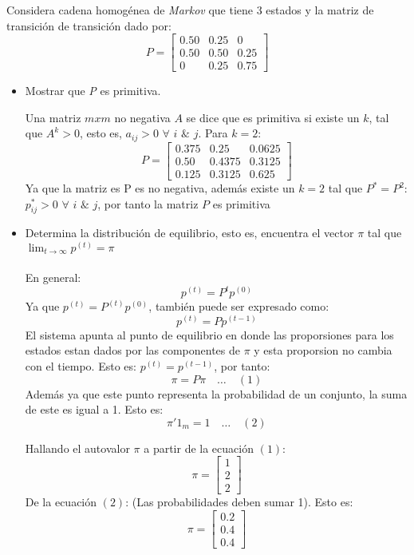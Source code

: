 Considera cadena homogénea de \textit{Markov} que tiene 3 estados y la matriz
    de transición de transición dado por:
    \[
        P =
            \begin{bmatrix}
                0.50 & 0.25 & 0 \\
                0.50 & 0.50 & 0.25\\
                0 & 0.25 & 0.75
            \end{bmatrix}
    \]
    \begin{itemize}
        \item Mostrar que \textit{P} es primitiva.

        Una matriz $mxm$ no negativa $A$ se dice que es primitiva si existe un $k$, tal que
        $A^k > 0$, esto es, $a_{ij} > 0$ $\forall$ $i$ $\&$ $j$. 
        Para $k = 2$:\\
        \[
            P =
                \begin{bmatrix}
                    0.375 & 0.25 & 0.0625 \\
                    0.50 & 0.4375 & 0.3125\\
                    0.125 & 0.3125 & 0.625
                \end{bmatrix}
        \]
        Ya que la matriz es P es no negativa, además existe un $k = 2$ tal que $P^* = P^2$: $p^*_{ij} > 0$ $\forall$ $i$ $\&$ $j$, por tanto la matriz $P$ es primitiva
        \item Determina la distribución de equilibrio, esto es, encuentra el vector
        $\pi$ tal que $\lim_{t \to \infty} p^{(t)} = \pi$\\\\
        En general:
        \[
            p^{(t)} = P^tp^{(0)} 
        \]
        Ya que $p^{(t)} = P^{(t)}p^{(0)}$, también puede ser expresado como:
        \[
            p^{(t)} = Pp^{(t-1)}
        \]
        El sistema apunta al punto de equilibrio en donde las proporsiones para los estados
        estan dados por las componentes de $\pi$ y esta proporsion no cambia con el tiempo.
        Esto es: $p^{(t)} = p^{(t-1)}$, por tanto:
        \[
                \pi = P\pi  \quad \dots \quad(1)
        \]
        Además ya que este punto representa la probabilidad de un conjunto, la suma de este es igual a 1.
        Esto es:
        \[
                \pi'1_m = 1 \quad \dots \quad(2)
        \]

        Hallando el autovalor $\pi$ a partir de la ecuación $(1)$:
        \[
            \pi = 
                \begin{bmatrix}
                    1 \\
                    2\\
                    2
                \end{bmatrix}
        \]
        De la ecuación $(2)$: (Las probabilidades deben sumar 1).
        Esto es:
        \[
            \pi = 
                \begin{bmatrix}
                    0.2 \\
                    0.4\\
                    0.4
                \end{bmatrix}
        \]
    \end{itemize}